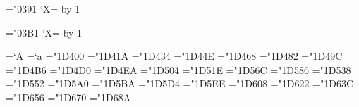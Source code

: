 \newcount\umathnumA  \newcount\umathnumB

\def\umathcorr#1#2{\expandafter#1\expandafter{\the#2}}
\def\umathprepare#1{\def\umathscanholes##1[#1]##2##3\relax{##2}}
\def\umathvalue#1{\expandafter\umathscanholes\umathcharholes[#1]{#1}\relax}

\def\umathcharholes{%
   [119893]{"210E}[119965]{"212C}[119968]{"2130}[119969]{"2131}%
   [119971]{"210B}[119972]{"2110}[119975]{"2112}[119976]{"2133}[119981]{"211B}%
   [119994]{"212F}[119996]{"210A}[120004]{"2134}%
   [120070]{"212D}[120075]{"210C}[120076]{"2111}[120085]{"211C}[120093]{"2128}%
   [120122]{"2102}[120127]{"210D}[120133]{"2115}[120135]{"2119}
   [120136]{"211A}[120137]{"211D}[120145]{"2124}%
}
\def\umathrange#1#2{\umathnumB=#2\relax \umathrangeA#1}
\def\umathrangeA#1-#2{\umathnumA=`#1\relax
   \loop
      \umathcorr\umathprepare\umathnumB
      \Umathcode \umathnumA = 7 1 \umathcorr\umathvalue{\umathnumB}
      \ifnum\umathnumA<`#2\relax
         \advance\umathnumA by1 \advance\umathnumB by1
   \repeat
}
\def\umathrangeGREEK{\begingroup
   \lccode`A="0391 \lccode`Z="03A9
   \lowercase{\endgroup\umathrange{A-Z}}}
\def\umathrangegreek{\begingroup
   \lccode`A="03B1 \lccode`Z="03D6
   \lowercase{\endgroup\umathrange{A-Z}}}
\def\greekdef#1{\ifx#1\relax \else
   \begingroup \lccode`X=\umathnumB \lowercase{\endgroup \def#1{X}}%
   \advance\umathnumB by 1
   \expandafter\greekdef \fi
}
\umathnumB="0391
\greekdef \Alpha \Beta \Gamma \Delta \Epsilon \Zeta \Eta \Theta \Iota \Kappa
   \Lambda \Mu \Nu \Xi \Omicron \Pi \Rho \varTheta \Sigma \Tau \Upsilon \Phi
   \Chi \Psi \Omega \relax

\umathnumB="03B1
\greekdef \alpha \beta \gamma \delta \epsilon \zeta \eta \theta \iota \kappa
   \lambda \mu \nu \xi \omicron \pi \rho \varsigma \sigma \tau \upsilon
   \varphi \chi \psi \omega \varbeta \vartheta \phi \varpi \relax

\chardef\ncharrmA=`A       \chardef\ncharrma=`a
\chardef\ncharbfA="1D400   \chardef\ncharbfa="1D41A
\chardef\ncharitA="1D434   \chardef\ncharita="1D44E
\chardef\ncharbiA="1D468   \chardef\ncharbia="1D482
\chardef\ncharclA="1D49C   \chardef\ncharcla="1D4B6
\chardef\ncharbcA="1D4D0   \chardef\ncharbca="1D4EA
\chardef\ncharfrA="1D504   \chardef\ncharfra="1D51E
\chardef\ncharbrA="1D56C   \chardef\ncharbra="1D586
\chardef\ncharbbA="1D538   \chardef\ncharbba="1D552
\chardef\ncharsnA="1D5A0   \chardef\ncharsna="1D5BA
\chardef\ncharbsA="1D5D4   \chardef\ncharbsa="1D5EE
\chardef\ncharsiA="1D608   \chardef\ncharsia="1D622
\chardef\ncharsxA="1D63C   \chardef\ncharsxa="1D656
\chardef\ncharttA="1D670   \chardef\nchartta="1D68A

